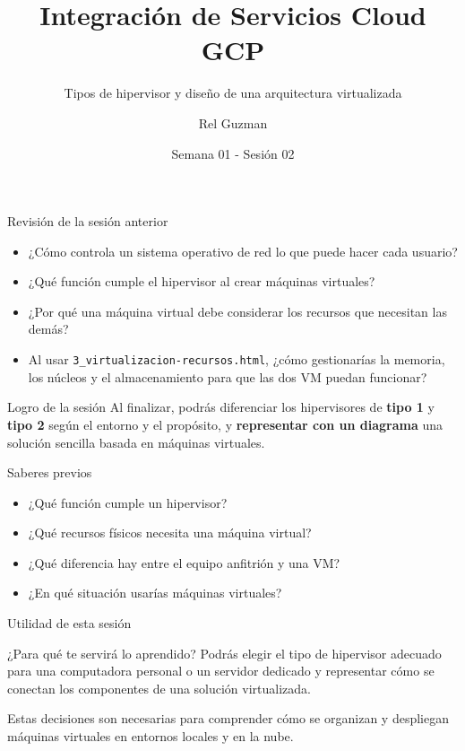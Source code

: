 \documentclass[aspectratio=169,10pt,c]{beamer}
\title{Integración de Servicios Cloud GCP}
\subtitle{Tipos de hipervisor y diseño de una arquitectura virtualizada}
\date{Semana 01 - Sesión 02}
\author{Rel Guzman}
\begin{document}
{\maketitle}

\begin{frame}{Revisión de la sesión anterior}
\begin{itemize}\setlength\itemsep{10pt}
  \item ¿Cómo controla un sistema operativo de red lo que puede hacer cada usuario?
  \item ¿Qué función cumple el hipervisor al crear máquinas virtuales?
  \item ¿Por qué una máquina virtual debe considerar los recursos que necesitan las demás?
  \item Al usar \texttt{3\_virtualizacion-recursos.html}, ¿cómo gestionarías la memoria, los núcleos y el almacenamiento para que las dos VM puedan funcionar?
\end{itemize}
\end{frame}

\begin{frame}[c]
\begin{block}{Logro de la sesión}
Al finalizar, podrás diferenciar los hipervisores de \textbf{tipo 1} y \textbf{tipo 2} según el entorno y el propósito, y \textbf{representar con un diagrama} una solución sencilla basada en máquinas virtuales.
\end{block}
\end{frame}

\begin{frame}{Saberes previos}
\begin{itemize}\setlength\itemsep{10pt}
  \item ¿Qué función cumple un hipervisor?
  \item ¿Qué recursos físicos necesita una máquina virtual?
  \item ¿Qué diferencia hay entre el equipo anfitrión y una VM?
  \item ¿En qué situación usarías máquinas virtuales?
\end{itemize}
\end{frame}

\begin{frame}{Utilidad de esta sesión}
\begin{block}{¿Para qué te servirá lo aprendido?}
Podrás elegir el tipo de hipervisor adecuado para una computadora personal o un servidor dedicado y representar cómo se conectan los componentes de una solución virtualizada.
\end{block}
\vspace{0.2cm}
\small Estas decisiones son necesarias para comprender cómo se organizan y despliegan máquinas virtuales en entornos locales y en la nube.
\end{frame}
\end{document}
